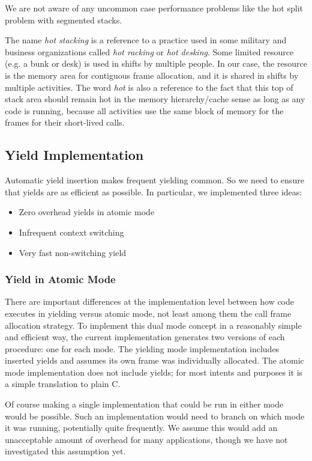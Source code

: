 \documentclass[preprint, 10pt, numbers]{sigplanconf}
\begin{document}
We are not aware of any uncommon case performance problems like the hot split problem with segmented stacks.

The name \emph{hot stacking} is a reference to a practice used in some military and business organizations called \emph{hot racking} or \emph{hot desking}.
Some limited resource (e.g. a bunk or desk) is used in shifts by multiple people.
In our case, the resource is the memory area for contiguous frame allocation, and it is shared in shifts by multiple activities.
The word \emph{hot} is also a reference to the fact that this top of stack area should remain hot in the memory hierarchy/cache sense as long as any code is running, because all activities use the same block of memory for the frames for their short-lived calls.

\subsection{Yield Implementation}
\label{sec:yield_imp}

Automatic yield insertion makes frequent yielding common.
So we need to ensure that yields are as efficient as possible.
In particular, we implemented three ideas:

\begin{itemize}
\item Zero overhead yields in atomic mode
\item Infrequent context switching
\item Very fast non-switching yield
\end{itemize}

\subsubsection{Yield in Atomic Mode}

There are important differences at the implementation level between how code executes in yielding versus atomic mode, not least among them the call frame allocation strategy.
To implement this dual mode concept in a reasonably simple and efficient way, the current \charcoal{} implementation generates two versions of each procedure: one for each mode.
The yielding mode implementation includes inserted yields and assumes its own frame was individually allocated.
The atomic mode implementation does not include yields; for most intents and purposes it is a simple translation to plain C.

Of course making a single implementation that could be run in either mode would be possible.
Such an implementation would need to branch on which mode it was running, potentially quite frequently.
We assume this would add an unacceptable amount of overhead for many applications, though we have not investigated this assumption yet.
\end{document}
